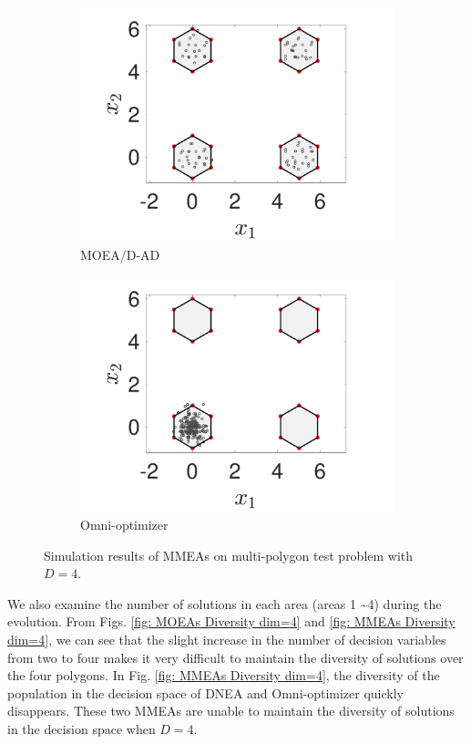 \documentclass[conference]{IEEEtran}
\begin{document}
\begin{figure}[htbp]
    \begin{subfigure}[b]{.24\textwidth}
    \includegraphics[width=\linewidth]{Section5/dim4/PS/MOEADAD}
    \caption{MOEA/D-AD}
    \end{subfigure}
    \begin{subfigure}[b]{.24\textwidth}
    \includegraphics[width=\linewidth]{Section5/dim4/PS/OmniOptimizer}
    \caption{Omni-optimizer}
    \end{subfigure}
    \caption{Simulation results of MMEAs on multi-polygon test problem with $D=4$.}
    \label{fig: MMEAs PS dim=4}
\end{figure}

We also examine the number of solutions in each area (areas 1 \textasciitilde 4) during the evolution. From Figs. \ref{fig: MOEAs Diversity dim=4} and \ref{fig: MMEAs Diversity dim=4}, we can see that the slight increase in the number of decision variables from two to four makes it very difficult to maintain the diversity of solutions over the four polygons. In Fig. \ref{fig: MMEAs Diversity dim=4}, the diversity of the population in the decision space of DNEA and Omni-optimizer quickly disappears. These two MMEAs are unable to maintain the diversity of solutions in the decision space when $D=4$. 
\end{document}
